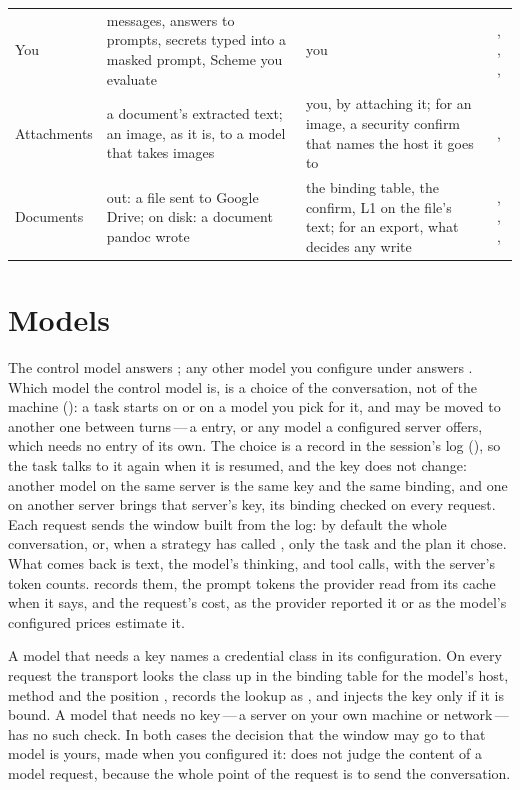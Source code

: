 {\begin{longtable}{@{}L{2.3cm}L{4.3cm}L{4.5cm}L{3.3cm}@{}}
You & messages, answers to prompts, secrets typed into a masked prompt, Scheme you evaluate & you & , , ,  \\
Attachments & a document's extracted text; an image, as it is, to a model that takes images & you, by attaching it; for an image, a security confirm that names the host it goes to & ,  \\
Documents & out: a file sent to Google Drive; on disk: a document pandoc wrote & the binding table, the confirm, L1 on the file's text; for an export, what decides any write & , , ,  \\
\bottomrule
\end{longtable}}

\section{Models}

The control model answers ; any other model you configure
under  answers . Which model
the control model is, is a choice of the conversation, not of the machine
(): a task starts on \code{[control]} or on a model you pick for it,
and may be moved to another one between turns\,---\,a
 entry, or any model a configured server offers, which
needs no entry of its own. The choice is a record in the session's log
(), so the task talks to it again when it is resumed,
and the key does not change: another model on the same server is the same
key and the same binding, and one on another server brings that server's
key, its binding checked on every request. Each request
sends the window built from the log: by default the whole conversation, or,
when a strategy has called , only the task and the plan
it chose. What comes back is text, the model's thinking, and tool calls,
with the server's token counts.  records them, the prompt
tokens the provider read from its cache when it says, and the request's
cost, as the provider reported it or as the model's configured prices
estimate it.

A model that needs a key names a credential class in its configuration. On
every request the transport looks the class up in the binding table for the
model's host, method and the position ,
records the lookup as , and injects the key only if it is
bound. A model that needs no key\,---\,a server on your own machine or
network\,---\,has no such check. In both cases the decision that the window
may go to that model is yours, made when you configured it: \nodwyn{} does
not judge the content of a model request, because the whole point of the
request is to send the conversation.

